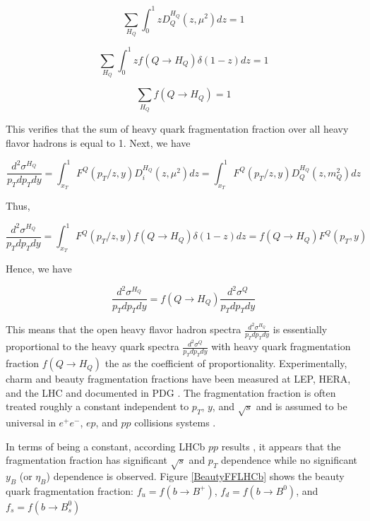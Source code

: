 \begin{equation}
\sum_{H_Q} \int_0^1 z D^{H_Q}_{Q}(z,\mu^2) dz = 1
\end{equation}

\begin{equation}
\sum_{H_Q} \int_0^1 z f(Q \rightarrow H_Q) \delta(1 - z) dz = 1
\end{equation}

\begin{equation}
\sum_{H_Q} f(Q \rightarrow H_Q) = 1 
\end{equation}

This verifies that the sum of heavy quark fragmentation fraction over all heavy flavor hadrons is equal to 1. Next, we have 


\begin{equation}
\frac{d^2\sigma^{H_Q}}{p_T dp_T dy} = \int_{x_T}^1 F^Q(p_T/z, y) D_{i}^{H_Q}(z,\mu^2) dz =  \int_{x_T}^1 F^Q(p_T/z, y) D^{H_Q}_{Q}(z,m_Q^2) dz 
\end{equation}

Thus,

\begin{equation}
\frac{d^2\sigma^{H_Q}}{p_T dp_T dy}  = \int_{x_T}^1 F^Q(p_T/z, y) f(Q \rightarrow H_Q) \delta(1 - z) dz =  f(Q \rightarrow H_Q)  F^Q(p_T, y)
\end{equation}

Hence, we have 

\begin{equation}
\frac{d^2\sigma^{H_Q}}{p_T dp_T dy} = f(Q \rightarrow H_Q) \frac{d^2\sigma^{Q}}{p_T dp_T dy}
\end{equation}

This means that the open heavy flavor hadron spectra $\frac{d^2\sigma^{H_Q}}{p_T dp_T dy}$ is essentially proportional to the heavy quark spectra $\frac{d^2\sigma^{Q}}{p_T dp_T dy}$ with heavy quark fragmentation fraction $f(Q \rightarrow H_Q)$ the as the coefficient of proportionality. Experimentally, charm and beauty fragmentation fractions have been measured at LEP, HERA, and the LHC and documented in PDG \cite{AlphaTheoEx}. The fragmentation fraction is often treated roughly a constant independent to $p_T$, $y$, and $\sqrt s$ and is assumed to be universal in $e^+e^-$, $ep$, and $pp$ collisions systems \cite{AlphaTheoEx}. 

In terms of being a constant, according LHCb $pp$ results \cite{LHCbFF}, it appears that the fragmentation fraction has significant $\sqrt s$ and $p_T$ dependence while no significant $y_B$ (or $\eta_B$) dependence is observed. Figure \ref{BeautyFFLHCb} shows the beauty quark fragmentation fraction: $f_u = f(b \rightarrow B^+)$, $f_d = f(b \rightarrow B^0)$, and $f_s = f(b \rightarrow B_s^0)$


